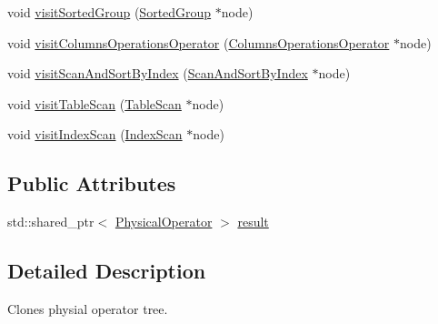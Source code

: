 \begin{DoxyCompactItemize}
\item 
void \hyperlink{class_cloning_physical_operator_visitor_a464894a18b7194c57e0c8d16f901ff5b}{visit\+Sorted\+Group} (\hyperlink{class_sorted_group}{Sorted\+Group} $\ast$node)
\item 
void \hyperlink{class_cloning_physical_operator_visitor_ad818258fa87a049e49d255107f655819}{visit\+Columns\+Operations\+Operator} (\hyperlink{class_columns_operations_operator}{Columns\+Operations\+Operator} $\ast$node)
\item 
void \hyperlink{class_cloning_physical_operator_visitor_a5bead629c3b23b39316b8b86913617e7}{visit\+Scan\+And\+Sort\+By\+Index} (\hyperlink{class_scan_and_sort_by_index}{Scan\+And\+Sort\+By\+Index} $\ast$node)
\item 
void \hyperlink{class_cloning_physical_operator_visitor_aa7066c58c8963023737f1b8e0eca7bca}{visit\+Table\+Scan} (\hyperlink{class_table_scan}{Table\+Scan} $\ast$node)
\item 
void \hyperlink{class_cloning_physical_operator_visitor_ae5e119521bb2d4654eebba24bc469739}{visit\+Index\+Scan} (\hyperlink{class_index_scan}{Index\+Scan} $\ast$node)
\end{DoxyCompactItemize}
\subsection*{Public Attributes}
\begin{DoxyCompactItemize}
\item 
std\+::shared\+\_\+ptr$<$ \hyperlink{class_physical_operator}{Physical\+Operator} $>$ \hyperlink{class_cloning_physical_operator_visitor_aa3705b767976ef07fdfe39458543138e}{result}
\end{DoxyCompactItemize}


\subsection{Detailed Description}
Clones physial operator tree. 

